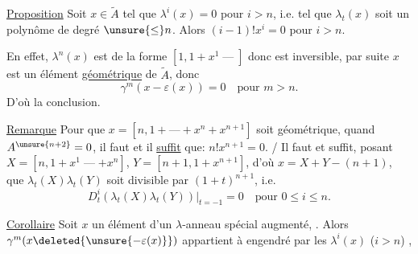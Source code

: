 \margin{$\big|$}
\uline{Proposition} Soit $x\in\widetilde A$ tel que  $\lambda^i(x)=0$ pour $i>n$, i.e. tel que $\lambda_t(x)$ soit un polynôme de degré $\unsure{\leq}n$. Alors  $(i-1)!x^i=0$ pour $i>n$.

En effet, $\lambda^n(x)$ est de la forme $[1,1+x^1\mathbin{\text{---}}]$ donc est inversible, par suite $x$ est un élément \uline{géométrique}  de $\widetilde A$, donc
\[
\gamma^m(x-\varepsilon(x))=0\quad\text{pour }m>n.
\]
D'où la conclusion.

\uline{Remarque} Pour que $x=[n,1+\text{---}+x^n+x^{n+1}]$ soit géométrique, quand $A^{\unsure{n+2}}=0$, il faut et il \uline{suffit} que: $n!x^{n+1}=0$.
/ Il faut et suffit, posant $X=[n,1+x^1\mathbin{\text{---}}+x^n]$, $Y=[n+1,1+x^{n+1}]$, d'où $x=X+Y-(n+1)$, que $\lambda_t(X)\lambda_t(Y)$ soit divisible par $(1+t)^{n+1}$,
i.e.
\[
D_t^i(\lambda_t(X)\lambda_t(Y))\big|_{t=-1}=0\quad\text{pour }0\leq i\leq n.
\]

\margin{$\Big|$}
\uline{Corollaire} Soit $x$ un élément  d'un $\lambda$-anneau spécial augmenté, . Alors $\gamma^m(x\deleted{\unsure{-\varepsilon(x)}})$ appartient à  engendré par les $\lambda^i(x)$ ($i>n$) 
,

